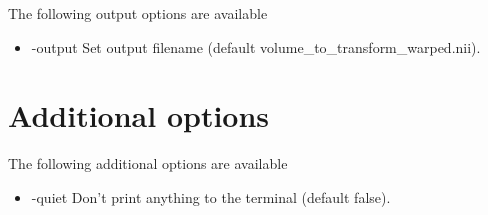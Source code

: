 The following output options are available

\begin{itemize}

\item -output 
\newline \newline Set output filename (default volume\_to\_transform\_warped.nii). 

\end{itemize}

\section{Additional options}

The following additional options are available

\begin{itemize}

\item -quiet 
\newline \newline Don't print anything to the terminal (default false). 

\end{itemize}


